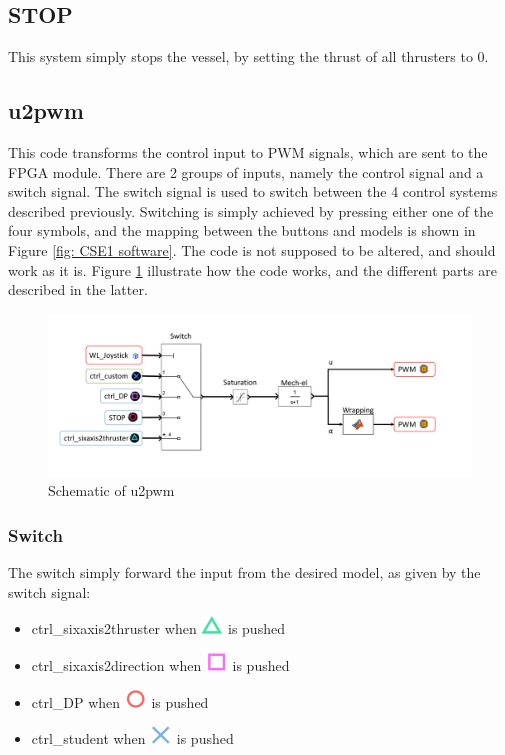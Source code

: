 \subsection{STOP}
This system simply stops the vessel, by setting the thrust of all thrusters to 0. 
\subsection{u2pwm}
This code transforms the control input to PWM signals, which are sent to the FPGA module. There are 2 groups of inputs, namely the control signal and a switch signal. The switch signal is used to switch between the 4 control systems described previously. Switching is simply achieved by pressing either one of the four symbols, and the mapping between the buttons and models is shown in Figure \ref{fig: CSE1 software}. The code is not supposed to be altered, and should work as it is. Figure \ref{fig:u2pwm} illustrate how the code works, and the different parts are described in the latter. 
\begin{figure}[htb!]
	\centerline{\includegraphics[width=1.1\textwidth]{fig/u2pwm.pdf}}
	\caption{Schematic of u2pwm}
	\label{fig:u2pwm}
\end{figure}

\subsubsection{Switch}
The switch simply forward the input from the desired model, as given by the switch signal:
\begin{itemize}
	\item ctrl\_sixaxis2thruster when \includegraphics[scale=0.4]{fig/sixaxis_triangle} is pushed
	\item ctrl\_sixaxis2direction when \includegraphics[scale=0.4]{fig/sixaxis_square} is pushed
	\item ctrl\_DP when \includegraphics[scale=0.4]{fig/sixaxis_circle} is pushed
	\item ctrl\_student when \includegraphics[scale=0.4]{fig/sixaxis_cross} is pushed
\end{itemize}
